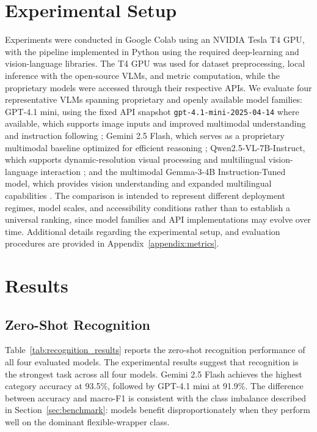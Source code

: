 \documentclass{article}
\begin{document}
\section{Experimental Setup}
\label{sec:experimental_setup}
Experiments were conducted in Google Colab using an NVIDIA Tesla T4 GPU, with the pipeline implemented in Python using the required deep-learning and vision-language libraries. The T4 GPU was used for dataset preprocessing, local inference with the open-source VLMs, and metric computation, while the proprietary models were accessed through their respective APIs. We evaluate four representative VLMs spanning proprietary and openly available model families: GPT-4.1 mini, using the fixed API snapshot \texttt{gpt-4.1-mini-2025-04-14} where available, which supports image inputs and improved multimodal understanding and instruction following \citep{openai2025gpt41}; Gemini 2.5 Flash, which serves as a proprietary multimodal baseline optimized for efficient reasoning \citep{google2025gemini25flash}; Qwen2.5-VL-7B-Instruct, which supports dynamic-resolution visual processing and multilingual vision-language interaction \citep{bai2025qwen25vl}; and the multimodal Gemma-3-4B Instruction-Tuned model, which provides vision understanding and expanded multilingual capabilities \citep{gemmateam2025gemma3}. The comparison is intended to represent different deployment regimes, model scales, and accessibility conditions rather than to establish a universal ranking, since model families and API implementations may evolve over time. Additional details regarding the experimental setup, and evaluation procedures are provided in Appendix~\ref{appendix:metrics}.


\section{Results}
\label{sec:results}


\subsection{Zero-Shot Recognition}
\label{subsec:recognition_results}

Table~\ref{tab:recognition_results} reports the zero-shot recognition performance of all four evaluated models.
The experimental results suggest that recognition is the strongest task across all four models. Gemini 2.5 Flash achieves the highest category accuracy at 93.5\%, followed by GPT-4.1 mini at 91.9\%. The difference between accuracy and macro-F1 is consistent with the class imbalance described in Section~\ref{sec:benchmark}: models benefit disproportionately when they perform well on the dominant flexible-wrapper class.
\end{document}
